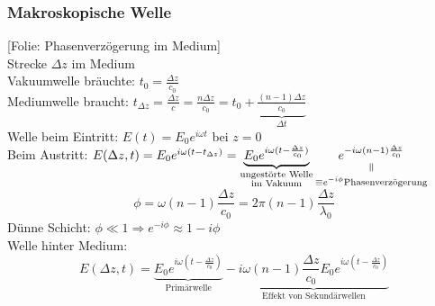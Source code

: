 \documentclass[titlepage,12pt,a4paper,ngerman]{report}
\newcommand{\verteq}{\rotatebox{90}{$\,=$}}
\newcommand{\equalto}[2]{\underset{\scriptstyle\overset{\mkern4mu\verteq}{#2}}{#1}}
\newcommand{\tx}[1]{\textrm{#1}}
\newcommand{\ub}[1]{\underbrace{#1}}
\newcommand{\folie}[1]{\color{gray}[Folie: #1]\color{black}}
\begin{document}
\subsubsection{Makroskopische Welle}
\folie{Phasenverzögerung im Medium}\\
Strecke $ \Delta z $ im Medium \\
Vakuumwelle bräuchte: $ t_0 = \frac{\Delta z}{c_0} $\\
Mediumwelle braucht: $ t_{\Delta z} = \frac{\Delta z}{c} = \frac{n \Delta z}{c_0} = t_0 + \ub{\frac{(n-1) \Delta z}{c_0}}_{\Delta t} $\\
Welle beim Eintritt: $ E(t) = E_0 e^{i \omega t} $ bei $ z=0 $\\
Beim Austritt: $ E(\Delta z , t) = E_0 e^{i \omega (t - t_{\Delta z})}  = \ub{E_0 e^{i \omega(t - \frac{\Delta z }{c_0})}}_{\substack{\tx{ungestörte Welle}\\\tx{im Vakuum}}} \equalto{e^{-i \omega(n-1) \frac{\Delta z}{c_0}}}{ \equiv e^{- i \phi} \tx{Phasenverzögerung}} $
$$\phi = \omega(n-1) \frac{\Delta z}{c_0} = 2 \pi (n-1) \frac{\Delta z}{\lambda_0}$$
Dünne Schicht: $ \phi \ll 1 \Rightarrow e^{-i\phi} \approx 1 - i \phi $\\
Welle hinter Medium:
$$E(\Delta z,t) = \ub{E_0 e^{i \omega(t - \frac{\Delta z}{c_0})}}_{\tx{Primärwelle}} - \ub{i \omega(n-1) \frac{\Delta z}{c_0} E_0 e^{i \omega(t - \frac{\Delta z}{c_0})}} _{\tx{Effekt von Sekundärwellen}}$$
\end{document}
